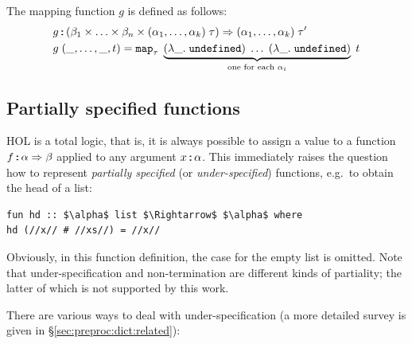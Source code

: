 
\noindent
The mapping function $g$ is defined as follows:
\begin{align*}
  &g \mathbin{:\!\!:} (\beta_1 \times \ldots \times \beta_n \times (\alpha_1, \ldots, \alpha_k)\;\tau) \Rightarrow (\alpha_1, \ldots, \alpha_k)\;\tau' \\
  &g\;(\_, \ldots, \_, t) = \texttt{\textup{map}}_\tau\;\underbrace{(\lambda \_.\; \texttt{\textup{undefined}})\;\ldots\;(\lambda \_.\; \texttt{\textup{undefined}})}_{\text{one for each $\alpha_i$}}\;t
\end{align*}

\subsection{Partially specified functions}
\label{sec:preproc:dict:partial}

HOL is a total logic, that is, it is always possible to assign a value to a function $f \mathbin{:\!\!:} \alpha \Rightarrow \beta$ applied to any argument $x \mathbin{:\!\!:} \alpha$.
This immediately raises the question how to represent \emph{partially specified} (or \emph{under-specified}) functions, e.g.\ to obtain the head of a list:
%
\begin{lstlisting}[language=Isabelle]
fun hd :: $\alpha$ list $\Rightarrow$ $\alpha$ where
hd (//x// # //xs//) = //x//
\end{lstlisting}
%
Obviously, in this function definition, the case for the empty list is omitted.
Note that under-specification and non-termination are different kinds of partiality; the latter of which is not supported by this work.


\noindent
There are various ways to deal with under-specification (a more detailed survey is given in §\ref{sec:preproc:dict:related}):

